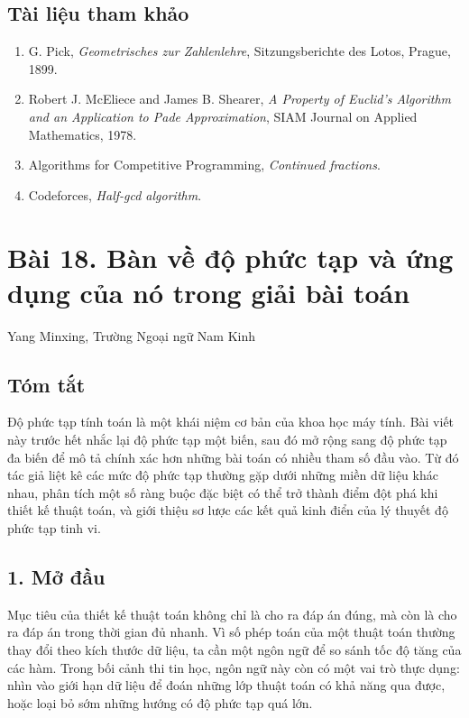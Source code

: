 \documentclass[11pt]{article}
\begin{document}
\subsection*{Tài liệu tham khảo}

\begin{enumerate}
\item G. Pick, \emph{Geometrisches zur Zahlenlehre}, Sitzungsberichte des
Lotos, Prague, 1899.
\item Robert J. McEliece and James B. Shearer, \emph{A Property of Euclid's
Algorithm and an Application to Pade Approximation}, SIAM Journal on Applied
Mathematics, 1978.
\item Algorithms for Competitive Programming, \emph{Continued fractions}.
\item Codeforces, \emph{Half-gcd algorithm}.
\end{enumerate}

\section*{Bài 18. Bàn về độ phức tạp và ứng dụng của nó trong giải bài toán}

\begin{center}
Yang Minxing, Trường Ngoại ngữ Nam Kinh
\end{center}

\subsection*{Tóm tắt}

Độ phức tạp tính toán là một khái niệm cơ bản của khoa học máy tính. Bài viết
này trước hết nhắc lại độ phức tạp một biến, sau đó mở rộng sang độ phức tạp
đa biến để mô tả chính xác hơn những bài toán có nhiều tham số đầu vào. Từ đó
tác giả liệt kê các mức độ phức tạp thường gặp dưới những miền dữ liệu khác
nhau, phân tích một số ràng buộc đặc biệt có thể trở thành điểm đột phá khi
thiết kế thuật toán, và giới thiệu sơ lược các kết quả kinh điển của lý thuyết
độ phức tạp tinh vi.

\subsection*{1. Mở đầu}

Mục tiêu của thiết kế thuật toán không chỉ là cho ra đáp án đúng, mà còn là cho
ra đáp án trong thời gian đủ nhanh. Vì số phép toán của một thuật toán thường
thay đổi theo kích thước dữ liệu, ta cần một ngôn ngữ để so sánh tốc độ tăng
của các hàm. Trong bối cảnh thi tin học, ngôn ngữ này còn có một vai trò thực
dụng: nhìn vào giới hạn dữ liệu để đoán những lớp thuật toán có khả năng qua
được, hoặc loại bỏ sớm những hướng có độ phức tạp quá lớn.
\end{document}
